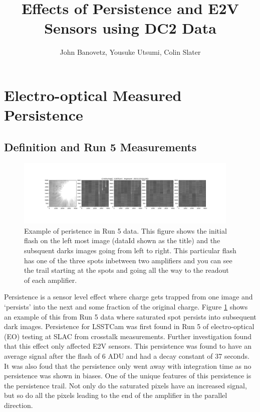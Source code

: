 \documentclass[DM,authoryear,toc]{lsstdoc}
\title{Effects of Persistence and E2V Sensors using DC2 Data}
\author{%
John Banovetz,
Yousuke Utsumi,
Colin Slater
}
\date{\vcsDate}
\begin{document}
\maketitle


\section{Electro-optical Measured Persistence}
\subsection[]{Definition and Run 5 Measurements}

\begin{figure}[!htp]
  \centering
  \includegraphics[width=0.95\textwidth, angle=0]{Run_5_persistence_ex.png}
  \caption{
  Example of peristence in Run 5 data. 
  This figure shows the initial flash on the left most image (dataId shown as the title) and the subsquent darks images going from left to right.
  This particular flash has one of the three spots inbetween two amplifiers and you can see the trail starting at the spots and going all the way to the readout of each amplifier.
  }\label{fig:ex_persistence_Run5}
\end{figure}

Persistence is a sensor level effect where charge gets trapped from one image and `persists' into the next and some fraction of the original charge. 
Figure \ref{fig:ex_persistence_Run5} shows an example of this from Run 5 data where saturated spot persists into subsequent dark images. 
Persistence for LSSTCam was first found in Run 5 of electro-optical (EO) testing at SLAC from crosstalk measurements. 
Further investigation found that this effect only affected E2V sensors. 
This persistence was found to have an average signal after the flash of 6 ADU and had a decay constant of 37 seconds. 
It was also foud that the persistence only went away with integration time as no persistence was shown in biases. 
One of the unique features of this persistence is the persistence trail. 
Not only do the saturated pixels have an increased signal, but so do all the pixels leading to the end of the amplifier in the parallel direction.
\end{document}
